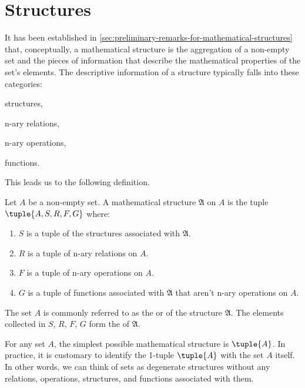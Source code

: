 \newpage
\section{Structures}
It has been established in \cref{sec:preliminary-remarks-for-mathematical-structures} that, conceptually,
a mathematical structure is the aggregation of a non-empty set and the pieces of information that describe
the mathematical properties of the set's elements. The descriptive information of a structure
typically falls into these categories:
\begin{enumerate*}[label=(\roman*)]
    \item structures,
    \item n-ary relations,
    \item n-ary operations,
    \item functions.
\end{enumerate*}
This leads us to the following definition.

\begin{dfn}
    \label{dfn:general-mathematical-structures}
    Let \( A \) be a non-empty set.
    A mathematical structure \( \mathfrak{A} \) on \( A \) is the tuple
    \( \tuple{A, S, R, F, G} \) where:
    \begin{enumerate}[topsep=2pt,noitemsep,label=\textup{\texttt{(\alph*)}}]
        \item \( S \) is a tuple of the structures associated with \( \mathfrak{A} \).
        \item \( R \) is a tuple of n-ary relations on \( A \).
        \item \( F \) is a tuple of n-ary operations on \( A \).
        \item \( G \) is a tuple of functions associated with \( \mathfrak{A} \) that aren't n-ary operations on \( A \).
    \end{enumerate}
    The set \( A \) is commonly referred to as the  or  of the structure \( \mathfrak{A} \).
    The elements collected in \( S \), \( R \), \( F \), \( G \) form the  of \( \mathfrak{A} \).
\end{dfn}

\begin{rem}
    For any set \( A \), the simplest possible mathematical structure is \( \tuple{A} \).
    In practice, it is customary to identify the 1-tuple \( \tuple{A} \) with the set \( A \) itself.
    In other words, we can think of sets as degenerate structures
    without any relations, operations, structures, and functions associated with them.
\end{rem}

